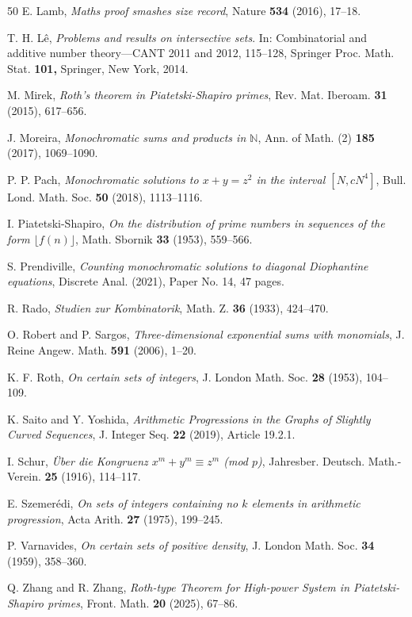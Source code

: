 \documentclass[12pt, reqno]{amsart}
\theoremstyle{definition}
\theoremstyle{remark}
\numberwithin{equation}{section}
\theoremstyle{definition}
\def \bN {\mathbb N}
\begin{document}
\begin{thebibliography}{50}
E. Lamb, \emph{Maths proof smashes size record}, Nature \textbf{534} (2016), 17--18.

T. H. L\^e, \emph{Problems and results on intersective sets}. In: Combinatorial and additive number theory---CANT 2011 and 2012, 115--128, Springer Proc. Math. Stat. \textbf{101,}
Springer, New York, 2014.

M. Mirek, \emph{Roth's theorem in Piatetski-Shapiro primes}, Rev. Mat. Iberoam. \textbf{31} (2015), 617--656.

J. Moreira, \emph{Monochromatic sums and products in $\bN$}, Ann. of Math. (2) \textbf{185} (2017), 1069--1090.

P. P. Pach, \emph{Monochromatic solutions to $x + y = z^2$ in the interval $[N, cN^4]$}, Bull. Lond. Math. Soc. \textbf{50} (2018), 1113--1116.

I. Piatetski-Shapiro, \emph{On the distribution of prime numbers in sequences of the form $\lfloor f(n) \rfloor$}, Math. Sbornik
\textbf{33} (1953), 559--566.

S. Prendiville, \emph{Counting monochromatic solutions to diagonal Diophantine equations}, Discrete Anal. (2021), Paper No. 14, 47 pages.

R. Rado, \emph{Studien zur Kombinatorik}, Math. Z. \textbf{36} (1933), 424--470.

O. Robert and P. Sargos, \emph{Three-dimensional exponential sums with monomials}, J. Reine Angew. Math. \textbf{591} (2006), 1--20.

K. F. Roth, \emph{On certain sets of integers}, J. London Math. Soc. \textbf{28} (1953),
104--109.

K. Saito and Y. Yoshida, \emph{Arithmetic Progressions in the Graphs of Slightly Curved Sequences}, J. Integer Seq. \textbf{22} (2019), Article 19.2.1.

I. Schur, \emph{\"Uber die Kongruenz $x^m + y^m \equiv z^m$ \rm{(mod $p$)}}, Jahresber. Deutsch. Math.-Verein. \textbf{25} (1916), 114--117.

E. Szemer\'edi, \emph{On sets of integers containing no $k$ elements in arithmetic progression}, Acta Arith. \textbf{27} (1975), 199--245.

P. Varnavides, \emph{On certain sets of positive density}, J. London Math. Soc. \textbf{34}
(1959), 358--360.

Q. Zhang and R. Zhang, \emph{Roth-type Theorem for High-power System in Piatetski-Shapiro primes}, Front. Math. \textbf{20} (2025), 67--86.

\end{thebibliography}
\end{document}

